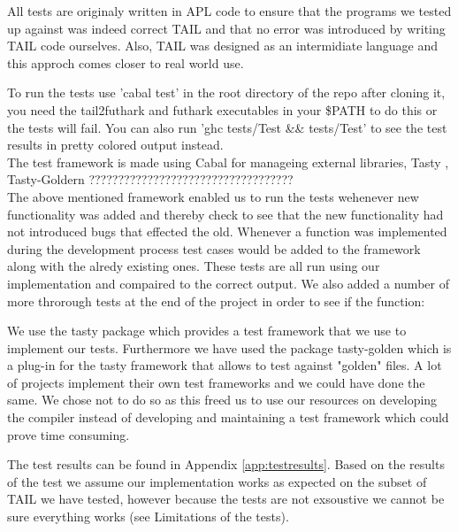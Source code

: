 \documentclass[11pt]{article}
\begin{document}
All tests are originaly written in APL code to ensure that the programs we tested up against was indeed correct TAIL and that no error was introduced by writing TAIL code ourselves. Also, TAIL was designed as an intermidiate language and this approch comes closer to real world use.

To run the tests use 'cabal test' in the root directory of the repo after cloning it, you need the tail2futhark and futhark
executables in your \$PATH to do this or the tests will fail. You can also run 'ghc tests/Test \&\& tests/Test' to see the
test results in pretty colored output instead.\\

The test framework is made using Cabal \cite{cabal} for manageing external libraries,  Tasty  \cite{tasty}, Tasty-Goldern \cite{tasty-golden}  ???????????????????????????????????\\


The above mentioned framework enabled us to run the tests wehenever new functionality was added and thereby check to see that the new functionality had not introduced bugs that effected the old. 
Whenever a function was implemented during the development process test cases would be added to the framework along with the alredy existing ones. These tests are all run using our implementation and compaired to the correct output.
We also added a number of more throrough tests at the end of the project in order to see if the function:

We use the tasty package \cite{tasty} which provides a test framework that we use to implement our tests. Furthermore we have used the
package tasty-golden \cite{tasty-golden} which is a plug-in for the tasty framework that allows to test against "golden" files.
A lot of projects implement their own test frameworks and we could have done the same.
We chose not to do so as this freed us to use our resources on developing the compiler instead of developing and maintaining a
test framework which could prove time consuming.

The test results can be found in Appendix \ref{app:testresults}. Based on the results of the test we assume our implementation works as expected on the subset of TAIL we have tested, however because the tests are not exsoustive we cannot be sure everything works (see Limitations of the tests).
\end{document}
